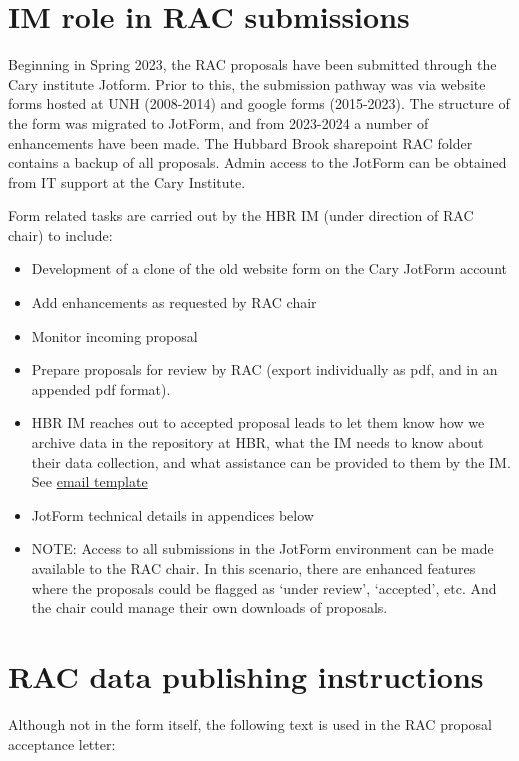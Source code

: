\documentclass[
  letterpaper,
  DIV=11,
  numbers=noendperiod]{scrreprt}
\begin{document}
\section{IM role in RAC submissions}\label{im-role-in-rac-submissions}

Beginning in Spring 2023, the RAC proposals have been submitted through
the Cary institute Jotform. Prior to this, the submission pathway was
via website forms hosted at UNH (2008-2014) and google forms
(2015-2023). The structure of the form was migrated to JotForm, and from
2023-2024 a number of enhancements have been made. The Hubbard Brook
sharepoint RAC folder contains a backup of all proposals. Admin access
to the JotForm can be obtained from IT support at the Cary Institute.

Form related tasks are carried out by the HBR IM (under direction of RAC
chair) to include:

\begin{itemize}
\item
  Development of a clone of the old website form on the Cary JotForm
  account
\item
  Add enhancements as requested by RAC chair
\item
  Monitor incoming proposal
\item
  Prepare proposals for review by RAC (export individually as pdf, and
  in an appended pdf format).
\item
  HBR IM reaches out to accepted proposal leads to let them know how we
  archive data in the repository at HBR, what the IM needs to know about
  their data collection, and what assistance can be provided to them by
  the IM. See \href{TBD}{email template}
\item
  JotForm technical details in appendices below
\item
  NOTE: Access to all submissions in the JotForm environment can be made
  available to the RAC chair. In this scenario, there are enhanced
  features where the proposals could be flagged as `under review',
  `accepted', etc. And the chair could manage their own downloads of
  proposals.
\end{itemize}

\section{RAC data publishing
instructions}\label{rac-data-publishing-instructions}

Although not in the form itself, the following text is used in the RAC
proposal acceptance letter:
\end{document}
